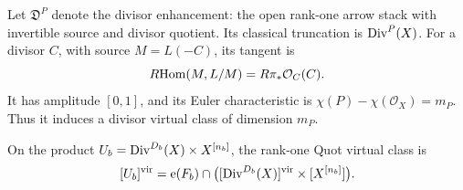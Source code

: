 Let \(\mathfrak D^P\) denote the divisor enhancement: the open
rank-one arrow stack with invertible source and divisor
quotient.  Its classical truncation is \(\operatorname{Div}^P(X)\).
For a divisor \(C\), with source \(M=L(-C)\), its tangent is
\[
 R\!\operatorname{Hom}(M,L/M)=R\pi_*\mathcal O_C(C).
\]
It has amplitude \([0,1]\), and its Euler characteristic is
\(\chi(P)-\chi(\mathcal O_X)=m_P\).  Thus it induces a divisor
virtual class of dimension \(m_P\).

\begin{lemma}\label{fix:excess}
On the product \(U_b=\operatorname{Div}^{D_b}(X)\times X^{[n_b]}\), the
rank-one Quot virtual class is
\begin{equation}\label{fix:low-product}
 [U_b]^{\mathrm{vir}}=
 \operatorname{e}(F_b)\cap
       \bigl([\operatorname{Div}^{D_b}(X)]^{\mathrm{vir}}\times[X^{[n_b]}]\bigr).
\end{equation}
\end{lemma}

